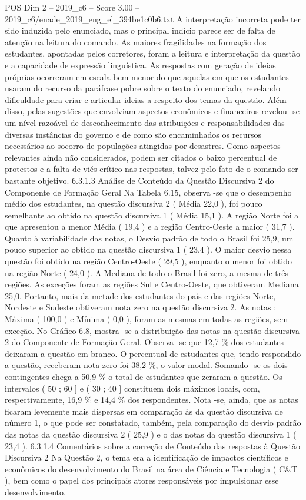\begin{textsample}{POS Dim 2 – 2019\_c6 – Score 3.00 – 2019\_c6/enade\_2019\_eng\_el\_394be1c0b6.txt}
A interpretação incorreta pode ter sido induzida pelo enunciado, mas o principal indício parece ser de falta de atenção na leitura do comando.
As maiores fragilidades na formação dos estudantes, apontadas pelos corretores, foram a leitura e interpretação da questão e a capacidade de expressão linguística.
As respostas com geração de ideias próprias ocorreram em escala bem menor do que aquelas em que os estudantes usaram do recurso da paráfrase pobre sobre o texto do enunciado, revelando dificuldade para criar e articular ideias a respeito dos temas da questão.
Além disso, pelas sugestões que envolviam aspectos econômicos e financeiros revelou -se um nível razoável de desconhecimento das atribuições e responsabilidades das diversas instâncias do governo e de como são encaminhados os recursos necessários ao socorro de populações atingidas por desastres.
Como aspectos relevantes ainda não considerados, podem ser citados o baixo percentual de protestos e a falta de viés crítico nas respostas, talvez pelo fato de o comando ser bastante objetivo. 6.3.1.3 Análise de Conteúdo da Questão Discursiva 2 do Componente de Formação Geral Na Tabela 6.15, observa -se que o desempenho médio dos estudantes, na questão discursiva 2 ( Média 22,0 ), foi pouco semelhante ao obtido na questão discursiva 1 ( Média 15,1 ).
A região Norte foi a que apresentou a menor Média ( 19,4 ) e a região Centro-Oeste a maior ( 31,7 ).
Quanto à variabilidade das notas, o Desvio padrão de todo o Brasil foi 25,9, um pouco superior ao obtido na questão discursiva 1 ( 23,4 ).
O maior desvio nessa questão foi obtido na região Centro-Oeste ( 29,5 ), enquanto o menor foi obtido na região Norte ( 24,0 ).
A Mediana de todo o Brasil foi zero, a mesma de três regiões.
As exceções foram as regiões Sul e Centro-Oeste, que obtiveram Mediana 25,0.
Portanto, mais da metade dos estudantes do país e das regiões Norte, Nordeste e Sudeste obtiveram nota zero na questão discursiva 2.
As notas : Máxima ( 100,0 ) e Mínima ( 0,0 ), foram as mesmas em todas as regiões, sem exceção.
No Gráfico 6.8, mostra -se a distribuição das notas na questão discursiva 2 do Componente de Formação Geral.
Observa -se que 12,7 \% dos estudantes deixaram a questão em branco.
O percentual de estudantes que, tendo respondido a questão, receberam nota zero foi 38,2 \%, o valor modal.
Somando -se os dois contingentes chega a 50,9 \% o total de estudantes que zeraram a questão.
Os intervalos ( 50 ; 60 ] e ( 30 ; 40 ] constituem dois máximos locais, com, respectivamente, 16,9 \% e 14,4 \% dos respondentes.
Nota -se, ainda, que as notas ficaram levemente mais dispersas em comparação às da questão discursiva de número 1, o que pode ser constatado, também, pela comparação do desvio padrão das notas da questão discursiva 2 ( 25,9 ) e o das notas da questão discursiva 1 ( 23,4 ). 6.3.1.4 Comentários sobre a correção de Conteúdo das respostas à Questão Discursiva 2 Na Questão 2, o tema era a identificação de impactos científicos e econômicos do desenvolvimento do Brasil na área de Ciência e Tecnologia ( C\&T ), bem como o papel dos principais atores responsáveis por impulsionar esse desenvolvimento.

\end{textsample}
